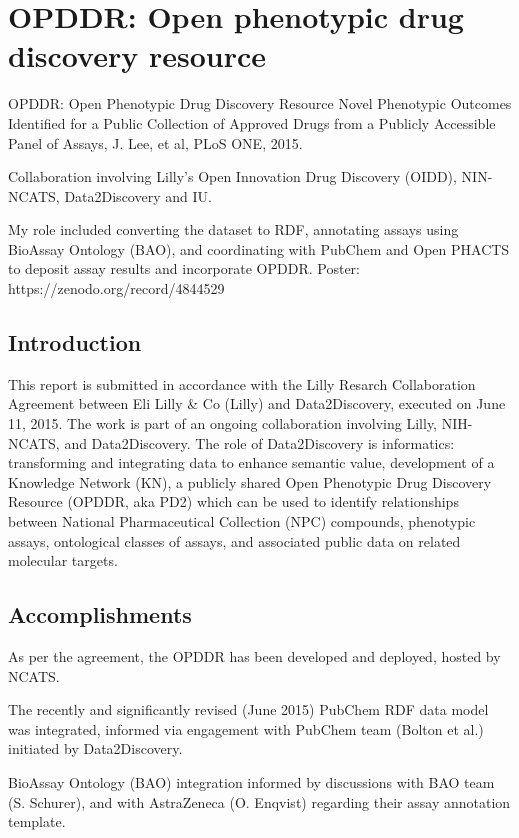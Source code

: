 \section{OPDDR: Open phenotypic drug discovery resource}

OPDDR: Open Phenotypic Drug Discovery Resource
Novel Phenotypic Outcomes Identified for a Public Collection of Approved Drugs from a Publicly Accessible Panel of Assays, J. Lee, et al, PLoS ONE, 2015\cite{Lee2015-vg}.

Collaboration involving Lilly's Open Innovation Drug Discovery (OIDD), NIN-NCATS, Data2Discovery and IU.  

My role included converting the dataset to RDF,  annotating assays using BioAssay Ontology (BAO), and coordinating with PubChem and Open PHACTS to deposit assay results and incorporate OPDDR.
Poster: https://zenodo.org/record/4844529

\subsection{Introduction}

This report is submitted in accordance with the Lilly Resarch Collaboration Agreement between Eli Lilly \& Co (Lilly) and Data2Discovery, executed on June 11, 2015.  The work is part of an ongoing collaboration involving Lilly, NIH-NCATS, and Data2Discovery.  The role of Data2Discovery is informatics: transforming and integrating data to enhance semantic value, development of a Knowledge Network (KN), a publicly shared Open Phenotypic Drug Discovery Resource (OPDDR, aka PD2) which can be used to identify relationships between National Pharmaceutical Collection (NPC) compounds, phenotypic assays, ontological classes of assays, and associated public data on related molecular targets.

\subsection{Accomplishments}

As per the agreement, the OPDDR has been developed and deployed, hosted by NCATS. 

The recently and significantly revised (June 2015) PubChem RDF data model was integrated, informed via engagement with PubChem team (Bolton et al.) initiated by Data2Discovery.

BioAssay Ontology (BAO) integration informed by discussions with BAO team (S. Schurer), and with AstraZeneca (O. Enqvist) regarding their assay annotation template. 

